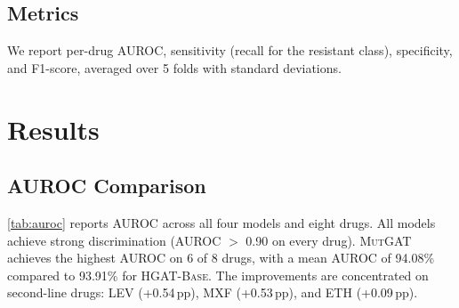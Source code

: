 \documentclass{article}
\theoremstyle{plain}
\theoremstyle{definition}
\theoremstyle{remark}
\begin{document}
\subsection{Metrics}

We report per-drug AUROC, sensitivity (recall for the resistant class), specificity, and F1-score, averaged over 5 folds with standard deviations.


\section{Results}
\label{sec:results}

\subsection{AUROC Comparison}

\cref{tab:auroc} reports AUROC across all four models and eight drugs. All models achieve strong discrimination (AUROC $>$ 0.90 on every drug). \textsc{MutGAT} achieves the highest AUROC on 6 of 8 drugs, with a mean AUROC of 94.08\% compared to 93.91\% for \textsc{HGAT-Base}. The improvements are concentrated on second-line drugs: LEV (+0.54\,pp), MXF (+0.53\,pp), and ETH (+0.09\,pp).
\end{document}
